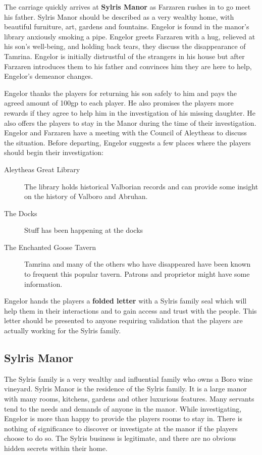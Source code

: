 \begin{multicols*}{2}
The carriage quickly arrives at \textbf{Sylris Manor} as Farzaren rushes in to go meet his father. Sylris Manor should be described as a very wealthy home, with beautiful furniture, art, gardens and fountains. Engelor is found in the manor’s library anxiously smoking a pipe. Engelor greets Farzaren with a hug, relieved at his son’s well-being, and holding back tears, they discuss the disappearance of Tamrina. Engelor is initially distrustful of the strangers in his house but after Farzaren introduces them to his father and convinces him they are here to help, Engelor's demeanor changes.

Engelor thanks the players for returning his son safely to him and pays the agreed amount of 100gp to each player. He also promises the players more rewards if they agree to help him in the investigation of his missing daughter. He also offers the players to stay in the Manor during the time of their investigation. Engelor and Farzaren have a meeting with the Council of Aleytheas to discuss the situation. Before departing, Engelor suggests a few places where the players should begin their investigation:

\begin{description}
	\item[Aleytheas Great Library] The library holds historical Valborian records and can provide some insight on the history of Valboro and Abruhan. 
	\item[The Docks] Stuff has been happening at the docks
	\item[The Enchanted Goose Tavern] Tamrina and many of the others who have disappeared have been known to frequent this popular tavern. Patrons and proprietor might have some information.
\end{description} 

Engelor hands the players a \textbf{folded letter} with a Sylris family seal which will help them in their interactions and to gain access and trust with the people. This letter should be presented to anyone requiring validation that the players are actually working for the Sylris family.

\subsection{Sylris Manor}
 The Sylris family is a very wealthy and influential family who owns a Boro wine vineyard. Sylris Manor is the residence of the Sylris family. It is a large manor with many rooms, kitchens, gardens and other luxurious features. Many servants tend to the needs and demands of anyone in the manor. While investigating, Engelor is more than happy to provide the players rooms to stay in. There is nothing of significance to discover or investigate at the manor if the players choose to do so. The Sylris business is legitimate, and there are no obvious hidden secrets within their home.


\end{multicols*}
